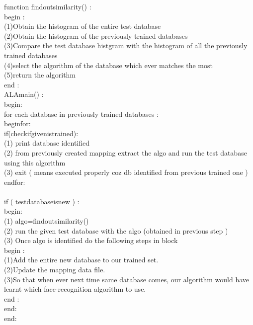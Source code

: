 \documentclass[10pt,a4paper]{article}
\begin{document}
function findoutsimilarity() : \\
begin : \\
\tab 	(1)Obtain the histogram of the entire test database \\
\tab	(2)Obtain the histogram of the previously trained databases \\
\tab	(3)Compare the test database histgram with the histogram of all the \tab previously trained databases \\
\tab	(4)select the algorithm of the database which ever matches the most \\
\tab	(5)return the algorithm \\
end : \\

ALAmain() : \\
begin: \\
\tab  for each database in previously trained databases : \\
\tab \tab beginfor:\\
\tab \tab   if(checkifgivenistrained): \\
\tab \tab \tab (1) print database identified \\ 
\tab \tab \tab (2) from previously created mapping extract the algo \tab \tab \tab  and run the test database using this algorithm \\
\tab \tab \tab (3) exit ( means executed properly coz db identified \tab \tab \tab from previous trained one ) \\
\tab \tab endfor:\\
\\
\tab if ( testdatabaseisnew ) : \\
\tab begin: \\
\tab \tab (1) algo=findoutsimilarity() \\
\tab \tab (2) run the given test database with the algo (obtained in \tab \tab previous step ) \\
\tab \tab (3) Once algo is identified do the following steps in block \\
\tab \tab begin : \\
\tab \tab \tab (1)Add the entire new database to our trained set.  \\
\tab \tab \tab (2)Update the mapping data file. \\
\tab \tab \tab (3)So that when ever next time same database comes, \tab \tab \tab our algorithm would have learnt which face-recognition \tab \tab \tab algorithm to use. \\
\tab \tab end : \\

\tab end: \\
end: \\    
\end{document}
